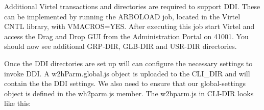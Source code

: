 \documentclass[letterpaper,10pt,english]{sphinxmanual}
\begin{document}
\begin{sphinxVerbatim}[commandchars=\\\{\}]
       
   
    
       
   
    
\end{sphinxVerbatim}


\ignorespaces 
Additional Virtel transactions and directories are required to support DDI. These can be implemented by running the ARBOLOAD job, located in the Virtel CNTL library, with VMACROS=YES. After executing this job start Virtel and access the Drag and Drop GUI from the Administration Portal on 41001. You should now see additional GRP-DIR, GLB-DIR and USR-DIR directories.



\ignorespaces 
Once the DDI directories are set up will can configure the necessary settings to invoke DDI. A w2hParm.global.js object is uploaded to the CLI\_DIR and will contain the the DDI settings. We also need to ensure that our global-settings object is defined in the wh2parm.js member. The w2hparm.js in CLI-DIR looks like this:
\end{document}
